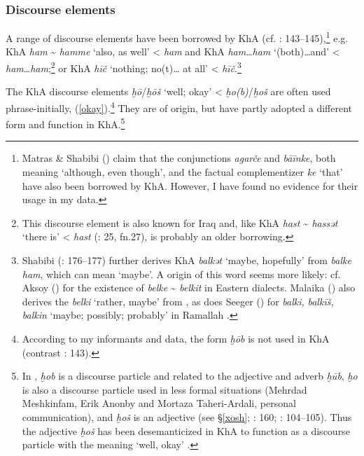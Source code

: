 \documentclass[output=paper,nonflat]{langsci/langscibook}
\begin{document}
\subsubsection{Discourse elements}

A range of  discourse elements have been borrowed by KhA (cf. \citealt{MatrasShabibi2007}: 143–145),\footnote{Matras \& Shabibi (\citeyear[144]{MatrasShabibi2007}) claim that the  conjunctions \textit{agarče} and \textit{bāīnke}, both meaning ‘although, even though’, and the  factual {complementizer} \textit{ke} ‘that’ have also been borrowed by KhA. However, I have found no evidence for their usage in my data.} e.g. KhA \textit{ham} \~{} \textit{hamme} ‘also, as well’ <  \textit{ham} and KhA \textit{ham}…\textit{ham} ‘(both)…and’ <  \textit{ham}…\textit{ham};\footnote{This discourse element is also known for Iraq \citep[36]{Malaika1963} and, like KhA \textit{hast} \~{} \textit{hassət} ‘there is’ <  \textit{hast} (\citealt{Ingham1973}: 25, fn.27), is probably an older borrowing.} or KhA \textit{hīč} ‘nothing; no(t)… at all’ <  \textit{hīč}.\footnote{Shabibi (\citeyear{Shabibi2006}: 176–177) further derives KhA \textit{balkət} ‘maybe, hopefully’ from  \textit{balke} \textit{ham}, which can mean ‘maybe’. A  origin of this word seems more likely: cf. Aksoy (\citeyear[620]{Aksoy1963}) for the existence of \textit{belke} \~{} \textit{belkit} in Eastern  dialects. Malaika (\citeyear[35]{Malaika1963}) also derives the   \textit{belki} ‘rather, maybe’ from , as does Seeger (\citeyear[28]{Seeger2009}) for \textit{balki,} \textit{balkīš,} \textit{balkin} ‘maybe; possibly; probably’ in Ramallah .} 

The KhA discourse elements \textit{ḫō}/\textit{ḫōš} ‘well; okay’ <  \textit{ḫo(b)}/\textit{ḫoš} are often used phrase-initially, (\ref{okay}).\footnote{According to my informants and data, the form \textit{ḫōb} is not used in KhA (contrast \citealt{MatrasShabibi2007}: 143).} They are of  origin, but have partly adopted a different form and function in KhA.\footnote{In , \textit{ḫob} is a discourse particle and related to the adjective and adverb \textit{ḫūb}, \textit{ḫo} is also a discourse particle used in less formal situations (Mehrdad Meshkinfam, Erik Anonby and Mortaza Taheri-Ardali, personal communication), and \textit{ḫoš} is an adjective (see §\ref{xosh}; \citealt{Shabibi2006}: 160; \citealt{Mohammadi2018}: 104--105). Thus the  adjective \textit{ḫoš} has been desemanticized in KhA to function as a discourse particle with the meaning ‘well, okay’ \citep[160]{Shabibi2006}.}
\end{document}
